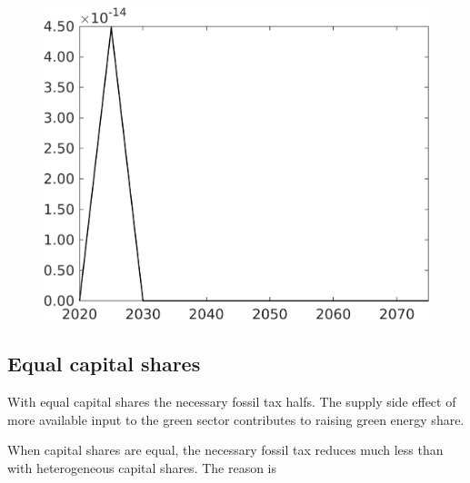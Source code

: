 \documentclass[12pt]{article}
\begin{document}
\begin{figure}[h!!]
\begin{minipage}[]{0.32\textwidth}
	\end{minipage}	
	\begin{minipage}[]{0.32\textwidth}
		\includegraphics[width=1\textwidth]{../../codding_model/own_basedOnFried/optimalPol_010922_revision/figures/all_13Sept22/CompTaufPER_bytaul_Reg0_F_spillover0_nsk0_xgr0_knspil1_sep0_LFlimit1_emsbase0_countec0_GovRev0_etaa0.79_lgd0.png}
	\end{minipage}	
\end{figure}
\clearpage 
\newpage
\subsection{Equal capital shares}
With equal capital shares the necessary fossil tax halfs. The supply side effect of more available input to the green sector contributes to raising green energy share.

When capital shares are equal, the necessary fossil tax reduces much less than with heterogeneous capital shares. The reason is
\end{document}
